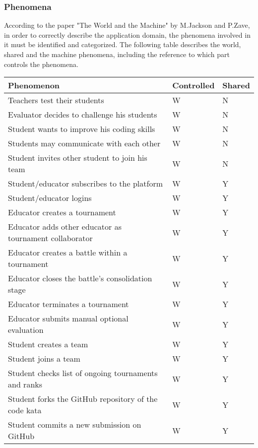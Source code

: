 \subsubsection{Phenomena}
According to the paper "The World and the Machine" by M.Jackson and P.Zave, in order to correctly describe the application domain, the phenomena involved in it must be identified and categorized. The following table describes the world, shared and the machine phenomena, including the reference to which part controls the phenomena.
\begin{table}[H]
    \begin{tabular}{|p{9.5cm}|p{2cm}|p{1.5cm}|}
        \hline
        \rowcolor{blue!50}
        Phenomenon & Controlled & Shared \\
        \hline
        Teachers test their students & W & N \\
        Evaluator decides to challenge his students & W & N \\
        Student wants to improve his coding skills & W & N \\
        Students may communicate with each other & W & N \\
        Student invites other student to join his team & W & N \\
        Student/educator subscribes to the platform & W & Y \\
        Student/educator logins & W & Y \\
        Educator creates a tournament & W & Y \\
        Educator adds other educator as tournament collaborator  & W & Y \\
        Educator creates a battle within a tournament & W & Y \\
        Educator closes the battle's consolidation stage & W & Y \\
        Educator terminates a tournament & W & Y \\
        Educator submits manual optional evaluation  & W & Y \\
        Student creates a team & W & Y \\
        Student joins a team & W & Y \\
        Student checks list of ongoing tournaments and ranks & W & Y \\
        Student forks the GitHub repository of the code kata & W & Y \\
        Student commits a new submission on GitHub & W & Y \\

\end{tabular}
\end{table}
